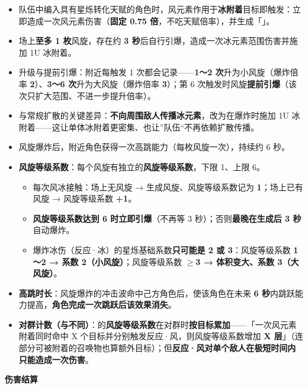 \begin{itemize}
\item 队伍中编入具有星烁转化天赋的角色时，风元素作用于\textbf{冰附着}目标即触发：立即造成一次风元素伤害（\textbf{固定 0.75 倍}，不吃天赋倍率），并生成「」。
\item 场上\textbf{至多 1 枚}风旋，存在约 \textbf{3 秒}后自行引爆，造成一次冰元素范围伤害并施加 1U 冰附着。
\item 升级与提前引爆：附近每触发 1 次都会记录——\textbf{1～2 次}升为小风旋（爆炸倍率 \textbf{2}）、\textbf{3～6 次}升为大风旋（爆炸倍率 \textbf{3}）；第 6 次触发时风旋\textbf{提前引爆}（该次只扩大范围、不进一步提升倍率）。
\item 与常规扩散的关键差异：\textbf{不向周围敌人传播冰元素}，改为在爆炸时施加 1U 冰附着——这让单体冰附着更密集、也让”队伍“不再依赖扩散传播。
\item 风旋爆炸后，附近角色获得一次高跳能力（每枚风旋一次），持续约 6 秒。
\item \textbf{风旋等级系数}：每个风旋有独立的\textbf{风旋等级系数}，下限 1、上限 6。
  \begin{itemize}
  \item 每次风冰接触：场上无风旋 → 生成风旋、风旋等级系数记为 \textbf{1}；场上已有风旋 → 风旋等级系数 \textbf{+1}。
  \item \textbf{风旋等级系数达到 6 时立即引爆}（不再等 3 秒）；否则\textbf{最晚在生成后 3 秒}自动爆炸。
  \item 爆炸冰伤（反应·冰）的星烁基础系数\textbf{只可能是 2 或 3}：风旋等级系数 \textbf{1～2 → 系数 2（小风旋）}；风旋等级系数 \textbf{$\geq$3 → 体积变大、系数 3（大风旋）}。
  \end{itemize}
\item \textbf{高跳时长}：风旋爆炸的冲击波命中己方角色后，使该角色在未来 \textbf{6 秒}内跳跃能力提高，\textbf{角色完成一次跳跃后该效果消失}。
\item \textbf{对群计数（与不同）}：的\textbf{风旋等级系数}在对群时\textbf{按目标累加}——「一次风元素附着同时命中 X 个目标并分别触发反应·风，则风旋等级系数增加 \textbf{X 层}」（连部分可被附着的召唤物也算额外目标）；但\textbf{反应·风对单个敌人在极短时间内只能造成一次伤害}。
\end{itemize}

\indent\textbf{伤害结算} 

